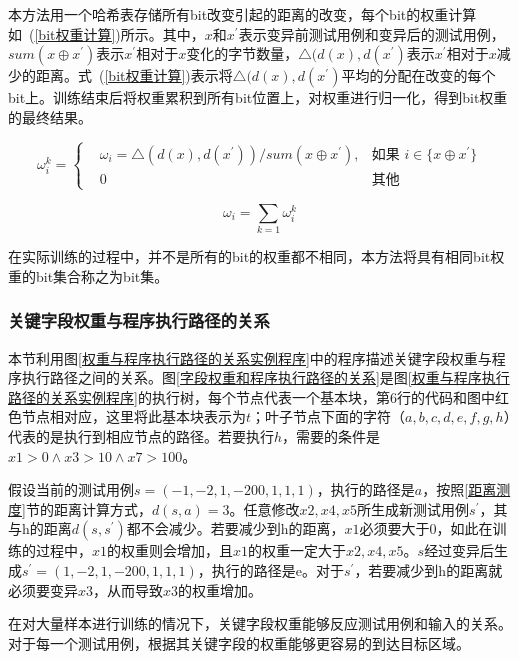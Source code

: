 本方法用一个哈希表存储所有bit改变引起的距离的改变，每个bit的权重计算如~(\ref{bit权重计算})所示。其中，$x$和$x^{'}$表示变异前测试用例和变异后的测试用例，$sum(x \oplus x^{'})$表示$x^{'}$相对于$x$变化的字节数量，$\bigtriangleup (d(x),d(x^{'})$表示$x^{'}$相对于$x$减少的距离。式~(\ref{bit权重计算})表示将$\bigtriangleup (d(x),d(x^{'})$平均的分配在改变的每个bit上。训练结束后将权重累积到所有bit位置上，对权重进行归一化，得到bit权重的最终结果。

\begin{equation}\label{bit权重计算}
\omega^{k}_{i}=\left\{
\begin{aligned}
& \omega_{i} = \bigtriangleup (d(x),d(x^{'}))/sum(x \oplus x^{'}), & \text{如果 } i \in \{ x \oplus x^{'} \}\\
& 0 & \text{其他}
\end{aligned}
\right.
\end{equation} 

\begin{equation}\label{bit权重累积}
\omega_{i} = \sum_{k=1} \omega^{k}_{i}
\end{equation}

在实际训练的过程中，并不是所有的bit的权重都不相同，本方法将具有相同bit权重的bit集合称之为bit集。

\subsubsection{关键字段权重与程序执行路径的关系}

本节利用图\ref{权重与程序执行路径的关系实例程序}中的程序描述关键字段权重与程序执行路径之间的关系。图\ref{字段权重和程序执行路径的关系}是图\ref{权重与程序执行路径的关系实例程序}的执行树，每个节点代表一个基本块，第6行的代码和图中红色节点相对应，这里将此基本块表示为$t$；叶子节点下面的字符（$a,b,c,d,e,f,g,h$）代表的是执行到相应节点的路径。若要执行$h$，需要的条件是$x1>0 \wedge x3>10 \wedge x7>100$。

假设当前的测试用例$s=(-1,-2,1,-200,1,1,1)$，执行的路径是$a$，按照\ref{距离测度}节的距离计算方式，$d(s,a) = 3$。任意修改$x2,x4,x5$所生成新测试用例$s^{'}$，其与h的距离$d(s,s^{'})$都不会减少。若要减少到h的距离，$x1$必须要大于0，如此在训练的过程中，$x1$的权重则会增加，且$x1$的权重一定大于$x2,x4,x5$。$s$经过变异后生成$s^{'}=(1,-2,1,-200,1,1,1)$，执行的路径是e。对于$s^{'}$，若要减少到h的距离就必须要变异$x3$，从而导致$x3$的权重增加。

在对大量样本进行训练的情况下，关键字段权重能够反应测试用例和输入的关系。对于每一个测试用例，根据其关键字段的权重能够更容易的到达目标区域。

